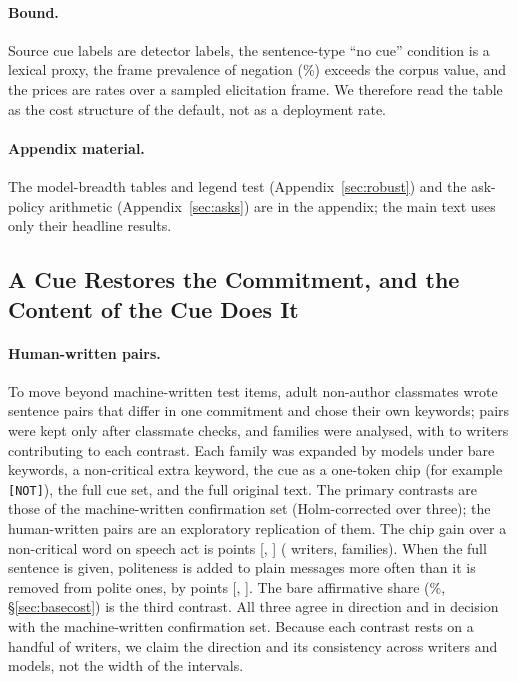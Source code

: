 \paragraph{Bound.}
Source cue labels are detector labels, the sentence-type ``no cue'' condition is a lexical proxy, the frame prevalence of negation (\jmtTwoPrevPol{}\%) exceeds the corpus value, and the prices are rates over a sampled elicitation frame. We therefore read the table as the cost structure of the default, not as a deployment rate.

\paragraph{Appendix material.} The model-breadth tables and legend test (Appendix~\ref{sec:robust}) and the ask-policy arithmetic (Appendix~\ref{sec:asks}) are in the appendix; the main text uses only their headline results.

\subsection{A Cue Restores the Commitment, and the Content of the Cue Does It}\label{sec:cue}

\paragraph{Human-written pairs.}
To move beyond machine-written test items, \jmhwWritersTotal{} adult non-author classmates wrote sentence pairs that differ in one commitment and chose their own keywords; pairs were kept only after classmate checks, and \jmhwFamilies{} families were analysed, with \jmhwChipGainWriters{} to \jmhwAffShareWriters{} writers contributing to each contrast. Each family was expanded by \jmbreadthOrigModels{} models under bare keywords, a non-critical extra keyword, the cue as a one-token chip (for example \texttt{[NOT]}), the full cue set, and the full original text. The primary contrasts are those of the machine-written confirmation set (Holm-corrected over three); the human-written pairs are an exploratory replication of them. The chip gain over a non-critical word on speech act is \jmhwChipGain{} points [\jmhwChipGainLo{}, \jmhwChipGainHi{}] (\jmhwChipGainWriters{} writers, \jmhwChipGainFamilies{} families). When the full sentence is given, politeness is added to plain messages more often than it is removed from polite ones, by \jmhwPolGain{} points [\jmhwPolGainLo{}, \jmhwPolGainHi{}]. The bare affirmative share (\jmhwAffAll{}\%, \S\ref{sec:basecost}) is the third contrast. All three agree in direction and in decision with the machine-written confirmation set. Because each contrast rests on a handful of writers, we claim the direction and its consistency across writers and models, not the width of the intervals.

